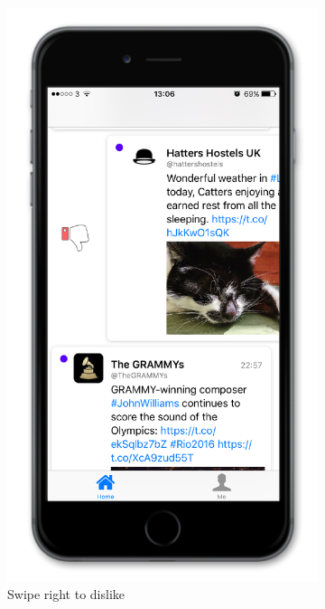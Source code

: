 \documentclass{article}
\begin{document}
\newpage


\begin{figure}[H]
    \centering
    \begin{subfigure}[b]{0.48\textwidth}
        \includegraphics[width=\textwidth]{iphone_9_dislike1}
        \caption{Swipe right to dislike}
    \end{subfigure}
    ~ 
    \begin{subfigure}[b]{0.48\textwidth}

\end{subfigure}
\end{figure}
\end{document}
